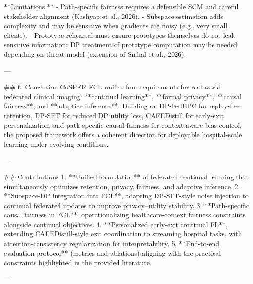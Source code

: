 **Limitations.**  
- Path-specific fairness requires a defensible SCM and careful stakeholder alignment (Kashyap et al., 2026).  
- Subspace estimation adds complexity and may be sensitive when gradients are noisy (e.g., very small clients).  
- Prototype rehearsal must ensure prototypes themselves do not leak sensitive information; DP treatment of prototype computation may be needed depending on threat model (extension of Sinhal et al., 2026).

---

## 6. Conclusion  
CaSPER-FCL unifies four requirements for real-world federated clinical imaging: **continual learning**, **formal privacy**, **causal fairness**, and **adaptive inference**. Building on DP-FedEPC for replay-free retention, DP-SFT for reduced DP utility loss, CAFEDistill for early-exit personalization, and path-specific causal fairness for context-aware bias control, the proposed framework offers a coherent direction for deployable hospital-scale learning under evolving conditions.

---

## Contributions  
1. **Unified formulation** of federated continual learning that simultaneously optimizes retention, privacy, fairness, and adaptive inference.  
2. **Subspace-DP integration into FCL**, adapting DP-SFT-style noise injection to continual federated updates to improve privacy–utility stability.  
3. **Path-specific causal fairness in FCL**, operationalizing healthcare-context fairness constraints alongside continual objectives.  
4. **Personalized early-exit continual FL**, extending CAFEDistill-style exit coordination to streaming hospital tasks, with attention-consistency regularization for interpretability.  
5. **End-to-end evaluation protocol** (metrics and ablations) aligning with the practical constraints highlighted in the provided literature.

---